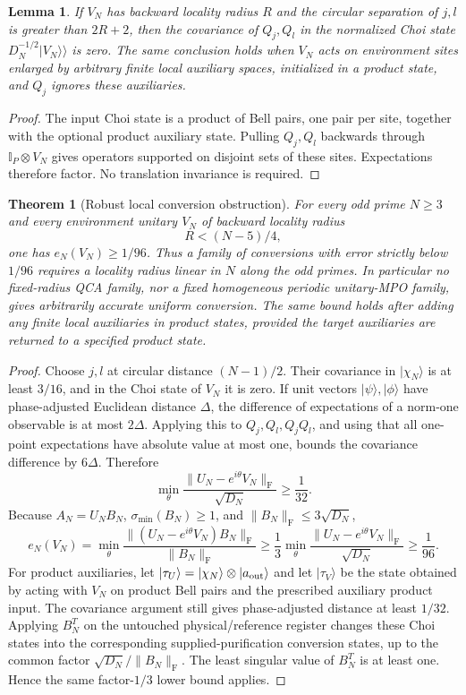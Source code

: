 \documentclass[11pt]{article}
\newtheorem{theorem}{Theorem}
\newtheorem{lemma}{Lemma}
\newcommand{\Id}{\mathbb I}
\newcommand{\F}{\mathrm F}
\begin{document}
\begin{lemma}
If $V_N$ has backward locality radius $R$ and the circular separation of $j,l$ is greater than $2R+2$, then the covariance of $Q_j,Q_l$ in the normalized Choi state $D_N^{-1/2}|V_N\rangle\!\rangle$ is zero. The same conclusion holds when $V_N$ acts on environment sites enlarged by arbitrary finite local auxiliary spaces, initialized in a product state, and $Q_j$ ignores these auxiliaries.
\end{lemma}
\begin{proof}
The input Choi state is a product of Bell pairs, one pair per site, together with the optional product auxiliary state. Pulling $Q_j,Q_l$ backwards through $\Id_P\otimes V_N$ gives operators supported on disjoint sets of these sites. Expectations therefore factor. No translation invariance is required.
\end{proof}

\begin{theorem}[Robust local conversion obstruction]
For every odd prime $N\ge3$ and every environment unitary $V_N$ of backward locality radius
\[
 R<(N-5)/4,
\]
one has $e_N(V_N)\ge1/96$. Thus a family of conversions with error strictly below $1/96$ requires a locality radius linear in $N$ along the odd primes. In particular no fixed-radius QCA family, nor a fixed homogeneous periodic unitary-MPO family, gives arbitrarily accurate uniform conversion. The same bound holds after adding any finite local auxiliaries in product states, provided the target auxiliaries are returned to a specified product state.
\end{theorem}
\begin{proof}
Choose $j,l$ at circular distance $(N-1)/2$. Their covariance in $|\chi_N\rangle$ is at least $3/16$, and in the Choi state of $V_N$ it is zero.
If unit vectors $|\psi\rangle,|\phi\rangle$ have phase-adjusted Euclidean distance $\Delta$, the difference of expectations of a norm-one observable is at most $2\Delta$. Applying this to $Q_j,Q_l,Q_jQ_l$, and using that all one-point expectations have absolute value at most one, bounds the covariance difference by $6\Delta$. Therefore
\[
 \min_\theta\frac{\|U_N-e^{i\theta}V_N\|_\F}{\sqrt{D_N}}\ge\frac1{32}.
\]
Because $A_N=U_NB_N$, $\sigma_{\min}(B_N)\ge1$, and $\|B_N\|_\F\le3\sqrt{D_N}$,
\[
 e_N(V_N)=\min_\theta\frac{\|(U_N-e^{i\theta}V_N)B_N\|_\F}{\|B_N\|_\F}
 \ge\frac13\min_\theta\frac{\|U_N-e^{i\theta}V_N\|_\F}{\sqrt{D_N}}
 \ge\frac1{96}.
\]
For product auxiliaries, let $|\tau_U\rangle=|\chi_N\rangle\otimes|a_{\rm out}\rangle$ and let $|\tau_V\rangle$ be the state obtained by acting with $V_N$ on product Bell pairs and the prescribed auxiliary product input. The covariance argument still gives phase-adjusted distance at least $1/32$. Applying $B_N^T$ on the untouched physical/reference register changes these Choi states into the corresponding supplied-purification conversion states, up to the common factor $\sqrt{D_N}/\|B_N\|_\F$. The least singular value of $B_N^T$ is at least one. Hence the same factor-$1/3$ lower bound applies.
\end{proof}
\end{document}
